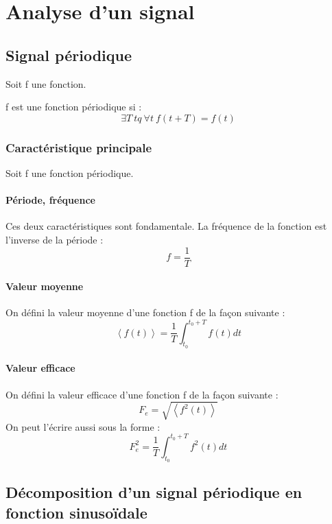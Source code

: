 \chapter{Analyse d'un signal}
\section{Signal périodique}
Soit f une fonction.
\begin{de}
f est une fonction périodique si :
$$\exists T~ tq~ \forall t~ f(t+T) = f(t)$$
\end{de}
\subsection{Caractéristique principale}
Soit f une fonction périodique.
\subsubsection{Période, fréquence}
Ces deux caractéristiques sont fondamentale. La fréquence de la fonction est l'inverse de la période :
$$f = \dfrac{1}{T}$$
\subsubsection{Valeur moyenne}
\begin{de}
On défini la valeur moyenne d'une fonction f de la façon suivante : 
$$\left\langle f(t) \right\rangle = \dfrac{1}{T} \int_{t_0}^{t_0+T} f(t)dt $$
\end{de}
\subsubsection{Valeur efficace}
\begin{de}
On défini la valeur efficace d'une fonction f de la façon suivante :
$$F_e = \sqrt{\left\langle f^2(t) \right\rangle}$$
On peut l'écrire aussi sous la forme : 
$$F_e^2 = \dfrac{1}{T} \int_{t_0}^{t_0+T} f^2(t)dt$$
\end{de}
\section{Décomposition d'un signal périodique en fonction sinusoïdale}
